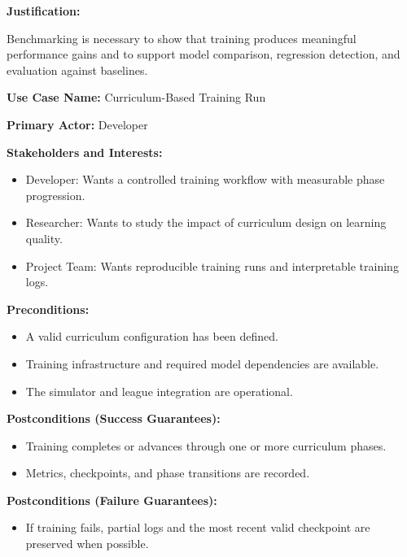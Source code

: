 \documentclass{article}
\begin{document}
\noindent\textbf{Justification:}

Benchmarking is necessary to show that training produces meaningful performance gains and to support model comparison, regression detection, and evaluation against baselines.

\vspace{1em}

\noindent\textbf{Use Case Name:} Curriculum-Based Training Run

\noindent\textbf{Primary Actor:} Developer

\noindent\textbf{Stakeholders and Interests:}
\begin{itemize}
    \item Developer: Wants a controlled training workflow with measurable phase progression.
    \item Researcher: Wants to study the impact of curriculum design on learning quality.
    \item Project Team: Wants reproducible training runs and interpretable training logs.
\end{itemize}

\noindent\textbf{Preconditions:}
\begin{itemize}
    \item A valid curriculum configuration has been defined.
    \item Training infrastructure and required model dependencies are available.
    \item The simulator and league integration are operational.
\end{itemize}

\noindent\textbf{Postconditions (Success Guarantees):}
\begin{itemize}
    \item Training completes or advances through one or more curriculum phases.
    \item Metrics, checkpoints, and phase transitions are recorded.
\end{itemize}

\noindent\textbf{Postconditions (Failure Guarantees):}
\begin{itemize}
    \item If training fails, partial logs and the most recent valid checkpoint are preserved when possible.
\end{itemize}
\end{document}
